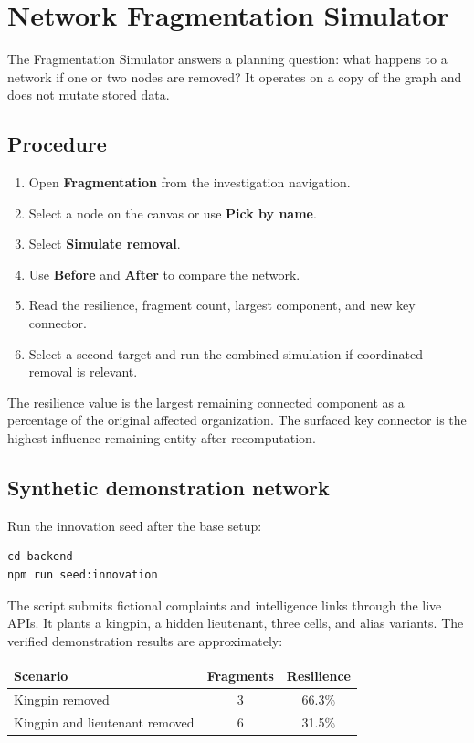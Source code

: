 \documentclass[11pt,a4paper]{article}
\begin{document}
\section{Network Fragmentation Simulator}

The Fragmentation Simulator answers a planning question: what happens to a network if one or two nodes are removed? It operates on a copy of the graph and does not mutate stored data.

\subsection{Procedure}

\begin{enumerate}[leftmargin=*]
  \item Open \textbf{Fragmentation} from the investigation navigation.
  \item Select a node on the canvas or use \textbf{Pick by name}.
  \item Select \textbf{Simulate removal}.
  \item Use \textbf{Before} and \textbf{After} to compare the network.
  \item Read the resilience, fragment count, largest component, and new key connector.
  \item Select a second target and run the combined simulation if coordinated removal is relevant.
\end{enumerate}

The resilience value is the largest remaining connected component as a percentage of the original affected organization. The surfaced key connector is the highest-influence remaining entity after recomputation.

\subsection{Synthetic demonstration network}

Run the innovation seed after the base setup:

\begin{lstlisting}
cd backend
npm run seed:innovation
\end{lstlisting}

The script submits fictional complaints and intelligence links through the live APIs. It plants a kingpin, a hidden lieutenant, three cells, and alias variants. The verified demonstration results are approximately:

\begin{center}
\begin{tabular}{lcc}
\toprule
\textbf{Scenario} & \textbf{Fragments} & \textbf{Resilience} \\
\midrule
Kingpin removed & 3 & 66.3\% \\
Kingpin and lieutenant removed & 6 & 31.5\% \\
\bottomrule
\end{tabular}
\end{center}
\end{document}
